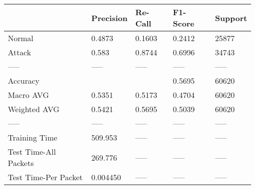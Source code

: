 \begin{tabular}{lllll}
\toprule
{} & Precision & Re-Call & F1-Score & Support \\
\midrule
Normal                &    0.4873 &  0.1603 &   0.2412 &   25877 \\
Attack                &     0.583 &  0.8744 &   0.6996 &   34743 \\
-----                 &     ----- &   ----- &    ----- &   ----- \\
Accuracy              &           &         &   0.5695 &   60620 \\
Macro AVG             &    0.5351 &  0.5173 &   0.4704 &   60620 \\
Weighted AVG          &    0.5421 &  0.5695 &   0.5039 &   60620 \\
-----                 &     ----- &   ----- &    ----- &   ----- \\
Training Time         &   509.953 &   ----- &    ----- &   ----- \\
Test Time-All Packets &   269.776 &   ----- &    ----- &   ----- \\
Test Time-Per Packet  &  0.004450 &   ----- &    ----- &   ----- \\
\bottomrule
\end{tabular}
